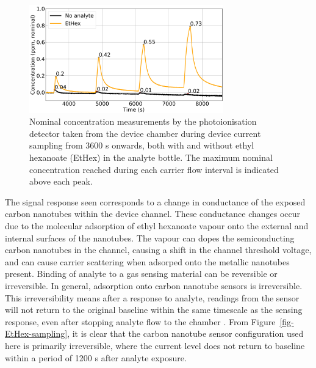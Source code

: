 \documentclass[
  a4paper,
]{scrbook}
\begin{document}
\begin{figure}

{\centering \includegraphics[width=0.75\textwidth,height=\textheight]{figures/ch6/input_time_comparison.png}

}

\caption{\label{fig-EtHex-sampling-PID}Nominal concentration
measurements by the photoionisation detector taken from the device
chamber during device current sampling from 3600 s onwards, both with
and without ethyl hexanoate (EtHex) in the analyte bottle. The maximum
nominal concentration reached during each carrier flow interval is
indicated above each peak.}

\end{figure}

The signal response seen corresponds to a change in conductance of the
exposed carbon nanotubes within the device channel. These conductance
changes occur due to the molecular adsorption of ethyl hexanoate vapour
onto the external and internal surfaces of the nanotubes. The vapour can
dopes the semiconducting carbon nanotubes in the channel, causing a
shift in the channel threshold voltage, and can cause carrier scattering
when adsorped onto the metallic nanotubes present. Binding of analyte to
a gas sensing material can be reversible or irreversible. In general,
adsorption onto carbon nanotube sensors is irreversible. This
irreversibility means after a response to analyte, readings from the
sensor will not return to the original baseline within the same
timescale as the sensing response, even after stopping analyte flow to
the chamber \autocite{Agnihotri2005,Lee2005}. From
Figure~\ref{fig-EtHex-sampling}, it is clear that the carbon nanotube
sensor configuration used here is primarily irreversible, where the
current level does not return to baseline within a period of 1200 s
after analyte exposure.
\end{document}
